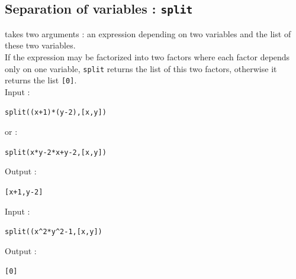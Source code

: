 \documentclass[a4paper,11pt]{book}
\begin{document}
\subsection{Separation of variables : {\tt split}}
 takes two arguments : an expression depending
on two variables and the list of these two variables.\\
If the expression may be factorized into two factors 
where each factor depends 
only on one variable, {\tt split} returns the list of this two 
factors, otherwise it returns the list {\tt [0]}.\\
Input :
\begin{center}{\tt split((x+1)*(y-2),[x,y])}\end{center}
or :
\begin{center}{\tt split(x*y-2*x+y-2,[x,y])}\end{center}
Output :
\begin{center}{\tt [x+1,y-2]}\end{center} 
Input :
\begin{center}{\tt split((x\verb|^|2*y\verb|^|2-1,[x,y])}\end{center}
Output :
\begin{center}{\tt [0]}\end{center}
\end{document}
